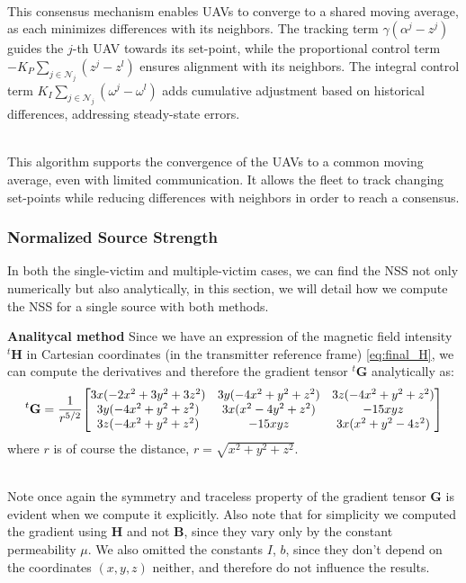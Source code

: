 \documentclass[main]{subfiles}
\begin{document}
\noindent\\
This consensus mechanism enables UAVs to converge to a shared moving average, 
as each minimizes differences with its neighbors. The tracking term \( \gamma(\alpha^j - z^j) \) 
guides the \( j \)-th UAV towards its set-point, while the proportional control term 
\( -K_P \sum_{j \in \mathcal{N}_j} (z^j - z^l) \) ensures alignment with its neighbors. 
The integral control term \( K_I \sum_{j \in \mathcal{N}_j} (\omega^j - \omega^l) \) 
adds cumulative adjustment based on historical differences, addressing steady-state errors.

\noindent\\
This algorithm supports the convergence of the UAVs to a common moving average, even with 
limited communication. It allows the fleet to track changing set-points while 
reducing differences with neighbors in order to reach a consensus.

\subsubsection{Normalized Source Strength}
In both the single-victim and multiple-victim cases, we can find the NSS not only numerically but also
analytically, in this section, we will detail how we compute the NSS for a single source with both methods.

\textbf{Analitycal method}
Since we have an expression of the magnetic field intensity ${}^t \mathbf{H}$
in Cartesian coordinates (in the transmitter reference frame) \eqref{eq:final_H}, we can compute the derivatives and therefore the
gradient tensor ${}^t \mathbf{G}$ analytically as:
\begin{equation}
{}^t \mathbf{G} = \frac{1}{r^{5/2}}
\scalebox{0.96}{$
\begin{bmatrix}
3 x (-2 x^2 + 3y^2 + 3z^2) & 3 y (-4 x^2 + y^2 + z^2) & 3 z (-4x^2 + y^2 + z^2) \\
3 y (-4 x^2 + y^2 + z^2) & 3 x (x^2 - 4 y^2 + z^2) & -15 x y z \\
3 z (-4 x^2 + y^2 + z^2) & -15 x y z & 3 x (x^2 + y^2 - 4 z^2)
\end{bmatrix}
$}
\label{eq:G_analit}
\end{equation}
where $r$ is of course the distance, $r = \sqrt{x^2 +y^2 +z^2}$.

\noindent\\
Note once again the symmetry and traceless property of the gradient tensor 
$\mathbf{G}$ is evident when we compute it explicitly.
Also note that for simplicity we computed the gradient using $\mathbf{H}$ and not $\mathbf{B}$,
since they vary only by the constant permeability $\mu$. 
We also omitted the constants $I$, $b$, since they don't depend on the coordinates $(x, y, z)$
neither, and therefore do not influence the results.
\end{document}
